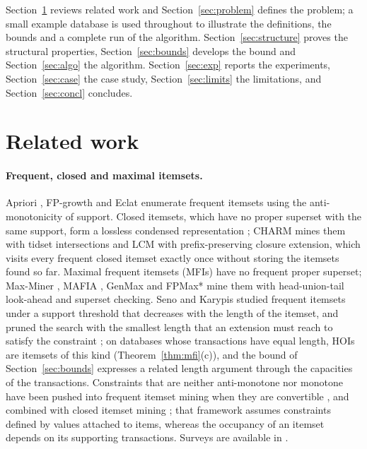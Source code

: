 \documentclass[pdflatex,sn-mathphys,Numbered]{sn-jnl}
\theoremstyle{thmstyleone}
\theoremstyle{thmstyletwo}
\theoremstyle{thmstylethree}
\begin{document}
Section~\ref{sec:related} reviews related work and Section~\ref{sec:problem} defines the problem; a small example database is used throughout to illustrate the definitions, the bounds and a complete run of the algorithm. Section~\ref{sec:structure} proves the structural properties, Section~\ref{sec:bounds} develops the bound and Section~\ref{sec:algo} the algorithm. Section~\ref{sec:exp} reports the experiments, Section~\ref{sec:case} the case study, Section~\ref{sec:limits} the limitations, and Section~\ref{sec:concl} concludes.

\section{Related work}\label{sec:related}

\paragraph{Frequent, closed and maximal itemsets.}
Apriori \cite{agrawal1994fast}, FP-growth \cite{han2000mining} and Eclat \cite{zaki2000scalable} enumerate frequent itemsets using the anti-monotonicity of support. Closed itemsets, which have no proper superset with the same support, form a lossless condensed representation \cite{pasquier1999closed}; CHARM \cite{zaki2002charm} mines them with tidset intersections and LCM \cite{uno2004lcm,uno2005lcm3} with prefix-preserving closure extension, which visits every frequent closed itemset exactly once without storing the itemsets found so far. Maximal frequent itemsets (MFIs) have no frequent proper superset; Max-Miner \cite{bayardo1998maxminer}, MAFIA \cite{burdick2005mafia}, GenMax \cite{gouda2005genmax} and FPMax* \cite{grahne2005fast} mine them with head-union-tail look-ahead and superset checking. Seno and Karypis studied frequent itemsets under a support threshold that decreases with the length of the itemset, and pruned the search with the smallest length that an extension must reach to satisfy the constraint \cite{seno2005ldsc}; on databases whose transactions have equal length, HOIs are itemsets of this kind (Theorem~\ref{thm:mfi}(c)), and the bound of Section~\ref{sec:bounds} expresses a related length argument through the capacities of the transactions. Constraints that are neither anti-monotone nor monotone have been pushed into frequent itemset mining when they are convertible \cite{pei2004convertible}, and combined with closed itemset mining \cite{bonchi2004closedconstrained}; that framework assumes constraints defined by values attached to items, whereas the occupancy of an itemset depends on its supporting transactions. Surveys are available in \cite{aggarwal2014frequent,luna2019review}.
\end{document}
